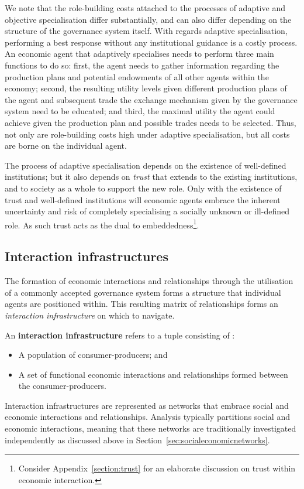 We note that the role-building costs attached to the processes of adaptive and objective specialisation differ substantially, and can also differ depending on the structure of the governance system itself. With regards adaptive specialisation, performing a best response without any institutional guidance is a costly process. An economic agent that adaptively specialises needs to perform three main functions to do so: first, the agent needs to gather information regarding the production plans and potential endowments of all other agents within the economy; second, the resulting utility levels given different production plans of the agent and subsequent trade the exchange mechanism given by the governance system need to be educated; and third, the maximal utility the agent could achieve given the production plan and possible trades needs to be selected. Thus, not only are role-building costs high under adaptive specialisation, but all costs are borne on the individual agent.

The process of adaptive specialisation depends on the existence of well-defined institutions; but it also depends on \emph{trust} that extends to the existing institutions, and to society as a whole to support the new role. Only with the existence of trust and well-defined institutions will economic agents embrace the inherent uncertainty and risk of completely specialising a socially unknown or ill-defined role. As such trust acts as the dual to embeddedness\footnote{Consider Appendix~\ref{section:trust} for an elaborate discussion on trust within economic interaction.}.

\subsection{Interaction infrastructures}

The formation of economic interactions and relationships through the utilisation of a commonly accepted governance system forms a structure that individual agents are positioned within. This resulting matrix of relationships forms an \emph{interaction infrastructure} on which to navigate.
\begin{definition} \label{definition:interactionInfrastruture}
An \textbf{interaction infrastructure} refers to a tuple consisting of : 
\begin{itemize}
\item[(1)] A population of consumer-producers; and 
\item[(2)] A set of functional economic interactions and relationships formed between the consumer-producers.
\end{itemize}
\end{definition} 
Interaction infrastructures are represented as networks that embrace social and economic interactions and relationships. Analysis typically partitions social and economic interactions, meaning that these networks are traditionally investigated independently as discussed above in Section~\ref{sec:socialeconomicnetworks}.


